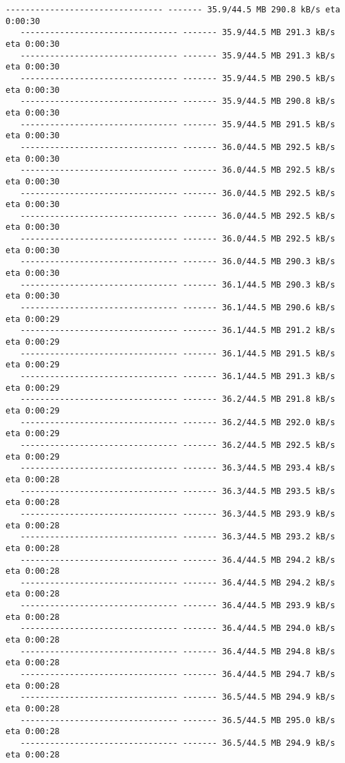 \documentclass[11pt]{article}
\begin{document}
\begin{Verbatim}[commandchars=\\\{\}]
   -------------------------------- ------- 35.9/44.5 MB 290.8 kB/s eta 0:00:30
   -------------------------------- ------- 35.9/44.5 MB 291.3 kB/s eta 0:00:30
   -------------------------------- ------- 35.9/44.5 MB 291.3 kB/s eta 0:00:30
   -------------------------------- ------- 35.9/44.5 MB 290.5 kB/s eta 0:00:30
   -------------------------------- ------- 35.9/44.5 MB 290.8 kB/s eta 0:00:30
   -------------------------------- ------- 35.9/44.5 MB 291.5 kB/s eta 0:00:30
   -------------------------------- ------- 36.0/44.5 MB 292.5 kB/s eta 0:00:30
   -------------------------------- ------- 36.0/44.5 MB 292.5 kB/s eta 0:00:30
   -------------------------------- ------- 36.0/44.5 MB 292.5 kB/s eta 0:00:30
   -------------------------------- ------- 36.0/44.5 MB 292.5 kB/s eta 0:00:30
   -------------------------------- ------- 36.0/44.5 MB 292.5 kB/s eta 0:00:30
   -------------------------------- ------- 36.0/44.5 MB 290.3 kB/s eta 0:00:30
   -------------------------------- ------- 36.1/44.5 MB 290.3 kB/s eta 0:00:30
   -------------------------------- ------- 36.1/44.5 MB 290.6 kB/s eta 0:00:29
   -------------------------------- ------- 36.1/44.5 MB 291.2 kB/s eta 0:00:29
   -------------------------------- ------- 36.1/44.5 MB 291.5 kB/s eta 0:00:29
   -------------------------------- ------- 36.1/44.5 MB 291.3 kB/s eta 0:00:29
   -------------------------------- ------- 36.2/44.5 MB 291.8 kB/s eta 0:00:29
   -------------------------------- ------- 36.2/44.5 MB 292.0 kB/s eta 0:00:29
   -------------------------------- ------- 36.2/44.5 MB 292.5 kB/s eta 0:00:29
   -------------------------------- ------- 36.3/44.5 MB 293.4 kB/s eta 0:00:28
   -------------------------------- ------- 36.3/44.5 MB 293.5 kB/s eta 0:00:28
   -------------------------------- ------- 36.3/44.5 MB 293.9 kB/s eta 0:00:28
   -------------------------------- ------- 36.3/44.5 MB 293.2 kB/s eta 0:00:28
   -------------------------------- ------- 36.4/44.5 MB 294.2 kB/s eta 0:00:28
   -------------------------------- ------- 36.4/44.5 MB 294.2 kB/s eta 0:00:28
   -------------------------------- ------- 36.4/44.5 MB 293.9 kB/s eta 0:00:28
   -------------------------------- ------- 36.4/44.5 MB 294.0 kB/s eta 0:00:28
   -------------------------------- ------- 36.4/44.5 MB 294.8 kB/s eta 0:00:28
   -------------------------------- ------- 36.4/44.5 MB 294.7 kB/s eta 0:00:28
   -------------------------------- ------- 36.5/44.5 MB 294.9 kB/s eta 0:00:28
   -------------------------------- ------- 36.5/44.5 MB 295.0 kB/s eta 0:00:28
   -------------------------------- ------- 36.5/44.5 MB 294.9 kB/s eta 0:00:28

\end{Verbatim}
\end{document}

